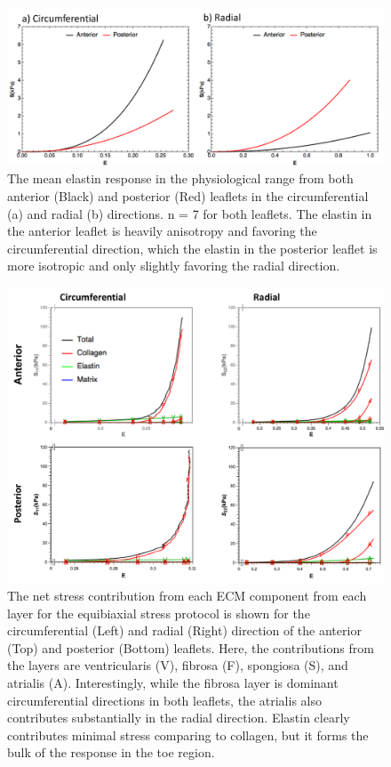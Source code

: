 \begin{figure}
\centering
\includegraphics[width=\textwidth]{Images/chapter2/figure10.pdf}
\caption{The mean elastin response in the physiological range from both anterior (Black) and posterior (Red) leaflets in the circumferential (a) and radial (b) directions. n = 7 for both leaflets. The elastin in the anterior leaflet is heavily anisotropy and favoring the circumferential direction, which the elastin in the posterior leaflet is more isotropic and only slightly favoring the radial direction.}
\label{c2:fig:10}
\end{figure}


\begin{figure}
\centering
\includegraphics[width=\textwidth]{Images/chapter2/figure11.pdf}
\caption{The net stress contribution from each ECM component from each layer for the equibiaxial stress protocol is shown for the circumferential (Left) and radial (Right) direction of the anterior (Top) and posterior (Bottom) leaflets. Here, the contributions from the layers are ventricularis (V), fibrosa (F), spongiosa (S), and atrialis (A). Interestingly, while the fibrosa layer is dominant circumferential directions in both leaflets, the atrialis also contributes substantially in the radial direction. Elastin clearly contributes minimal stress comparing to collagen, but it forms the bulk of the response in the toe region.}
\label{c2:fig:11}
\end{figure}




